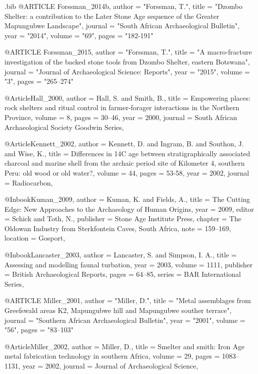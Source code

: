 \begin{filecontents}{\IJSRAidentifier.bib}
@ARTICLE {Forssman_2014b,
author  = "Forssman, T.",
title   = "Dzombo Shelter: a contribution to the Later Stone Age sequence of the Greater Mapungubwe Landscape",
journal = "South African Archaeological Bulletin",
year    = "2014",
volume  = "69",
pages   = "182-191"
}


@ARTICLE {Forssman_2015,
author  = "Forssman, T.",
title   = "A macro-fracture investigation of the backed stone tools from Dzombo Shelter, eastern Botswana",
journal = "Journal of Archaeological Science: Reports",
year    = "2015",
volume  = "3",
pages   = "265--274"
}

@Article{Hall_2000,
  author  = {Hall, S. and Smith, B.},
  title   = {Empowering places: rock shelters and ritual control in farmer-forager interactions in the Northern Province},
  volume  = {8},
  pages   = {30--46},
  year    = {2000},
  journal = {South African Archaeological Society Goodwin Series},
}

@Article{Kennett_2002,
  author  = {Kennett, D. and Ingram, B. and Southon, J. and Wise, K.},
  title   = {Differences in 14C age between stratigraphically associated charcoal and marine shell from the archaic period site of Kilometer 4, southern Peru: old wood or old water?},
  volume  = {44},
  pages   = {53-58},
  year    = {2002},
  journal = {Radiocarbon},
}

@Inbook{Kuman_2009,
  author    = {Kuman, K. and Fields, A.},
  title     = {The Cutting Edge: New Approaches to the Archaeology of Human Origins},
  year      = {2009},
  editor    = {Schick and Toth, N.},
  publisher = {Stone Age Institute Press},
  chapter   = {The Oldowan Industry from Sterkfontein Caves, South Africa},
  note      = {159--169},
  location  = {Gosport},
}

@Inbook{Lancaster_2003,
  author    = {Lancaster, S. and Simpson, I. A.},
  title     = {Assessing and modelling faunal turbation},
  year      = {2003},
  volume    = {1111},
  publisher = {British Archaeological Reports},
  pages   = {64--85},
  series    = {BAR International Series},
}


@ARTICLE {Miller_2001,
author  = "Miller, D.",
title   = "Metal assemblages from Greefswald areas K2, Mapungubwe hill and Mapungubwe souther terrace",
journal = "Southern African Archaeological Bulletin",
year    = "2001",
volume  = "56",
pages   = "83--103"
}

@Article{Miller_2002,
  author  = {Miller, D.},
  title   = {Smelter and smith: Iron Age metal fabrication technology in southern Africa},
  volume  = {29},
  pages   = {1083--1131},
  year    = {2002},
  journal = {Journal of Archaeological Science},
}


\end{filecontents}
